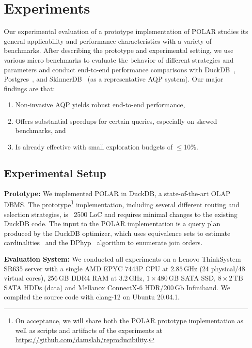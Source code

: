\section{Experiments}
\label{experiments}

Our experimental evaluation of a prototype implementation of POLAR studies its general applicability and performance characteristics with a variety of benchmarks. After describing the prototype and experimental setting, we use various micro benchmarks to evaluate the behavior of different strategies and parameters and conduct end-to-end performance comparisons with DuckDB~\cite{RaasveldtM19}, Postgres~\cite{DBLP:conf/sigmod/StonebrakerR86}, and SkinnerDB~\cite{TrummerWMMJA19, TrummerWWMMJAR21} (as a representative AQP system). Our major findings are that: 
\begin{enumerate}
\item Non-invasive AQP yields robust end-to-end performance,
\item Offers substantial speedups for certain queries, especially on skewed benchmarks, and
\item Is already effective with small exploration budgets of $\leq$10\%. 
\end{enumerate}

\subsection{Experimental Setup}

\textbf{Prototype:} We implemented POLAR in DuckDB, a state-of-the-art OLAP DBMS. The prototype\footnote{On acceptance, we will share both the POLAR prototype implementation as well as scripts and artifacts of the experiments at \url{https://github.com/damslab/reproducibility}.} implementation, including several different routing and selection strategies, is ~2500 LoC and requires minimal changes to the existing DuckDB code. The input to the POLAR implementation is a query plan produced by the DuckDB optimizer, which uses equivalence sets to estimate cardinalities~\cite{thesis/Ebergen22} and the DPhyp~\cite{MoerkotteN08} algorithm to enumerate join orders.  

\textbf{Evaluation System:} We conducted all experiments on a Lenovo ThinkSystem SR635 server with a single AMD EPYC 7443P CPU at $2.85$\,GHz (24 physical/48 virtual cores), 256\,GB DDR4 RAM at 3.2\,GHz, $1\times 480\,\text{GB}$ SATA SSD, $8\times 2\,\text{TB}$ SATA HDDs (data) and Mellanox ConnectX-6 HDR/200\,Gb Infiniband. We compiled the source code with clang-12 on Ubuntu 20.04.1.

